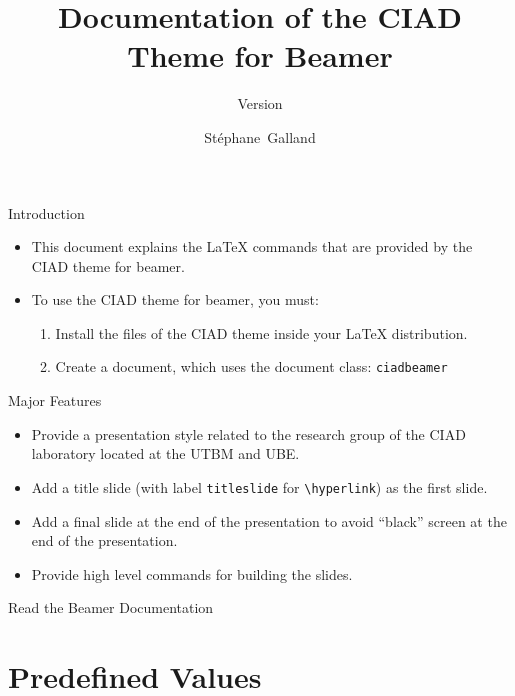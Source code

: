 \documentclass[english,sectioncirclenumberstyle]{ciadbeamer}
\title{Documentation of the CIAD Theme for Beamer}
\subtitle{Version \insertciadbeamerthemeversion}
\author[S.~Galland]{St\'ephane~Galland}
\begin{document}
\begin{frame}{Introduction}
	\begin{itemize}
	\item This document explains the {\LaTeX} commands that are provided by the CIAD theme for beamer.
	\vfill
	\item To use the CIAD theme for beamer, you must:
		\begin{enumerate}
		\item Install the files of the CIAD theme inside your {\LaTeX} distribution.
		\item Create a document, which uses the document class: \texttt{ciadbeamer}
		\end{enumerate}
	\end{itemize}
\end{frame}

\begin{frame}{Major Features}
	\begin{itemize}
	\item Provide a presentation style related to the research group of the CIAD laboratory located at the UTBM and UBE.
	\vfill
	\item Add a title slide (with label \texttt{titleslide} for \texttt{{\textbackslash}hyperlink}) as the first slide.
	\vfill
	\item Add a final slide at the end of the presentation to avoid ``black'' screen at the end of the presentation.
	\vfill
	\item Provide high level commands for building the slides.
	\end{itemize}
\end{frame}

\begin{frame}{Read the Beamer Documentation}
	\huge
	\vspace{2em}
\end{frame}

\tableofcontentslide

\section{Predefined Values}
\sectiontableofcontentslide
\end{document}
